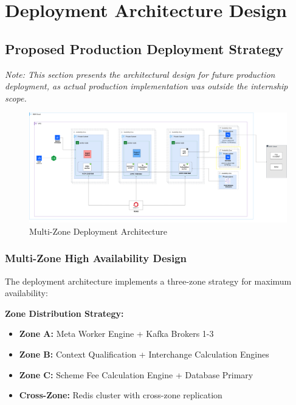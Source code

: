 \section{Deployment Architecture Design}

\subsection{Proposed Production Deployment Strategy}

\textit{Note: This section presents the architectural design for future production deployment, as actual production implementation was outside the internship scope.}

\begin{figure}[h]
    \centering
    \includegraphics[width=1\textwidth]{img/arch/p2s-workers-deployment.drawio.png}
    \caption{Multi-Zone Deployment Architecture}
    \label{fig:deployment}
\end{figure}

\subsubsection{Multi-Zone High Availability Design}

The deployment architecture implements a three-zone strategy for maximum availability:

\textbf{Zone Distribution Strategy:}
\begin{itemize}
    \item \textbf{Zone A:} Meta Worker Engine + Kafka Brokers 1-3
    \item \textbf{Zone B:} Context Qualification + Interchange Calculation Engines
    \item \textbf{Zone C:} Scheme Fee Calculation Engine + Database Primary
    \item \textbf{Cross-Zone:} Redis cluster with cross-zone replication
\end{itemize}

